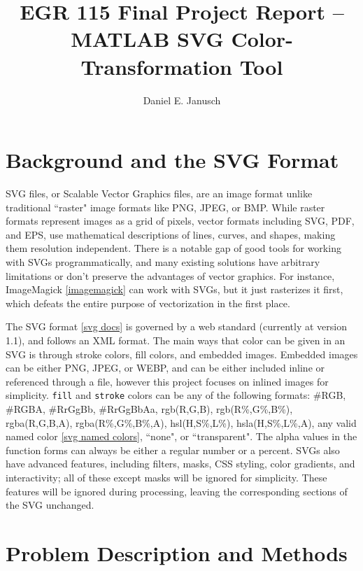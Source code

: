 \documentclass[12pt]{article}
\newcommand \iindent  {\indent \indent}
\newcommand \iiindent {\indent \iindent}
\begin{document}

\title{EGR 115 Final Project Report {\bf–} MATLAB SVG Color-Transformation Tool}
\author{Daniel E. Janusch}
\maketitle

\section{Background and the SVG Format}

\iiindent SVG files, or Scalable Vector Graphics files, are an image format unlike
traditional ``raster" image formats like PNG, JPEG, or BMP. While raster formats
represent images as a grid of pixels, vector formats including SVG, PDF, and EPS,
use mathematical descriptions of lines, curves, and shapes, making them resolution
independent. There is a notable gap of good tools for working with SVGs
programmatically, and many existing solutions have arbitrary limitations or don't
preserve the advantages of vector graphics. For instance, ImageMagick \ref{imagemagick}
can work with SVGs, but it just rasterizes it first, which defeats the entire purpose
of vectorization in the first place.
\vspace{5px}

\iindent The SVG format \ref{svg docs} is governed by a web standard (currently at
version 1.1), and follows an XML format. The main ways that color can be given in an
SVG is through stroke colors, fill colors, and embedded images. Embedded images can be
either PNG, JPEG, or WEBP, and can be either included inline or referenced through a
file, however this project focuses on inlined images for simplicity. \texttt{fill} and
\texttt{stroke} colors can be any of the following formats: \#RGB, \#RGBA, \#RrGgBb,
\#RrGgBbAa, rgb(R,G,B), rgb(R\%,G\%,B\%), rgba(R,G,B,A), rgba(R\%,G\%,B\%,A),
hsl(H,S\%,L\%), hsla(H,S\%,L\%,A), any valid named color \ref{svg named colors},
``none", or ``transparent". The alpha values in the function forms can always be
either a regular number or a percent. SVGs also have advanced features, including
filters, masks, CSS styling, color gradients, and interactivity; all of these except
masks will be ignored for simplicity. These features will be ignored during
processing, leaving the corresponding sections of the SVG unchanged.


\section{Problem Description and Methods}
\end{document}
